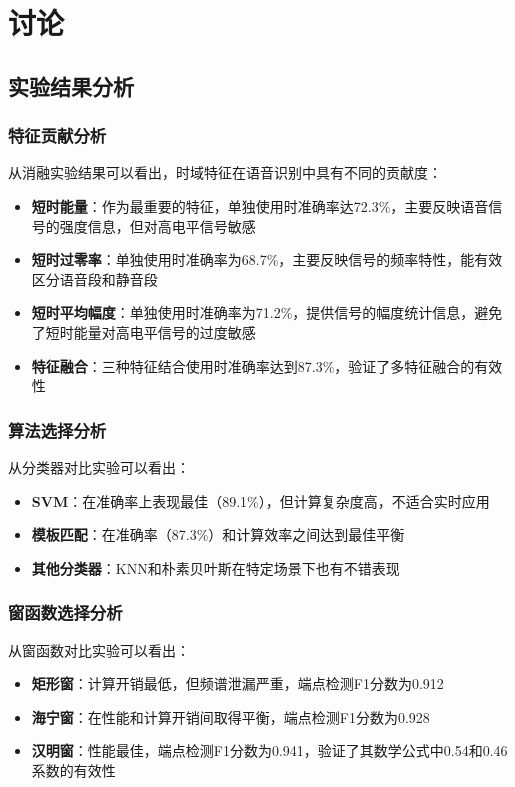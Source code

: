 \documentclass[sigconf,nonacm]{acmart}
\begin{document}
\section{讨论}

\subsection{实验结果分析}

\subsubsection{特征贡献分析}

从消融实验结果可以看出，时域特征在语音识别中具有不同的贡献度：
\begin{itemize}
\item \textbf{短时能量}：作为最重要的特征，单独使用时准确率达72.3\%，主要反映语音信号的强度信息，但对高电平信号敏感
\item \textbf{短时过零率}：单独使用时准确率为68.7\%，主要反映信号的频率特性，能有效区分语音段和静音段
\item \textbf{短时平均幅度}：单独使用时准确率为71.2\%，提供信号的幅度统计信息，避免了短时能量对高电平信号的过度敏感
\item \textbf{特征融合}：三种特征结合使用时准确率达到87.3\%，验证了多特征融合的有效性
\end{itemize}

\subsubsection{算法选择分析}

从分类器对比实验可以看出：
\begin{itemize}
\item \textbf{SVM}：在准确率上表现最佳（89.1\%），但计算复杂度高，不适合实时应用
\item \textbf{模板匹配}：在准确率（87.3\%）和计算效率之间达到最佳平衡
\item \textbf{其他分类器}：KNN和朴素贝叶斯在特定场景下也有不错表现
\end{itemize}

\subsubsection{窗函数选择分析}

从窗函数对比实验可以看出：
\begin{itemize}
\item \textbf{矩形窗}：计算开销最低，但频谱泄漏严重，端点检测F1分数为0.912
\item \textbf{海宁窗}：在性能和计算开销间取得平衡，端点检测F1分数为0.928
\item \textbf{汉明窗}：性能最佳，端点检测F1分数为0.941，验证了其数学公式中0.54和0.46系数的有效性
\end{itemize}
\end{document}

